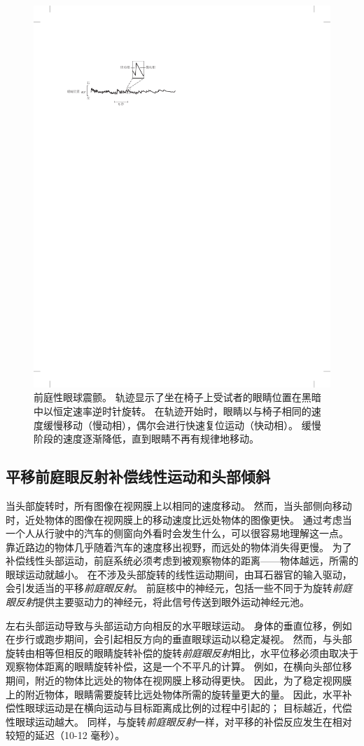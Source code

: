\begin{figure}[htbp]
	\centering
	\includegraphics[width=0.5\linewidth]{chap27/fig_27_12}
	\caption{前庭性眼球震颤。
		轨迹显示了坐在椅子上受试者的眼睛位置在黑暗中以恒定速率逆时针旋转。
		在轨迹开始时，眼睛以与椅子相同的速度缓慢移动（慢动相），偶尔会进行快速复位运动（快动相）。
		缓慢阶段的速度逐渐降低，直到眼睛不再有规律地移动。}
	\label{fig:27_12}
\end{figure}



\subsection{平移前庭眼反射补偿线性运动和头部倾斜}

当头部旋转时，所有图像在视网膜上以相同的速度移动。
然而，当头部侧向移动时，近处物体的图像在视网膜上的移动速度比远处物体的图像更快。
通过考虑当一个人从行驶中的汽车的侧窗向外看时会发生什么，可以很容易地理解这一点。
靠近路边的物体几乎随着汽车的速度移出视野，而远处的物体消失得更慢。
为了补偿线性头部运动，前庭系统必须考虑到被观察物体的距离——物体越远，所需的眼球运动就越小。
在不涉及头部旋转的线性运动期间，由耳石器官的输入驱动，会引发适当的平移\textit{前庭眼反射}。
前庭核中的神经元，包括一些不同于为旋转\textit{前庭眼反射}提供主要驱动力的神经元，将此信号传送到眼外运动神经元池。


左右头部运动导致与头部运动方向相反的水平眼球运动。
身体的垂直位移，例如在步行或跑步期间，会引起相反方向的垂直眼球运动以稳定凝视。
然而，与头部旋转由相等但相反的眼睛旋转补偿的旋转\textit{前庭眼反射}相比，水平位移必须由取决于观察物体距离的眼睛旋转补偿，这是一个不平凡的计算。
例如，在横向头部位移期间，附近的物体比远处的物体在视网膜上移动得更快。
因此，为了稳定视网膜上的附近物体，眼睛需要旋转比远处物体所需的旋转量更大的量。
因此，水平补偿性眼球运动是在横向运动与目标距离成比例的过程中引起的；
目标越近，代偿性眼球运动越大。
同样，与旋转\textit{前庭眼反射}一样，对平移的补偿反应发生在相对较短的延迟（10-12 毫秒）。


